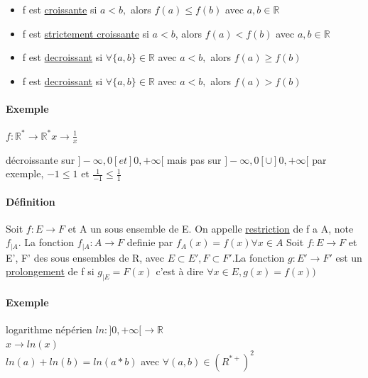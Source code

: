 \begin{itemize}
	\item f est \ul{croissante} si $a < b,$ alors $f(a) \leq f(b)$ avec $a, b \in \mathbb{R}$
	\item f est \ul{strictement croissante} si $a < b$, alors $f(a) < f(b)$ avec $a, b \in \mathbb{R}$
	\item f est \ul{decroissant} si $ \forall \{a, b\} \in \mathbb{R}$ avec $a < b,$ alors $f(a) \geq f(b)$
	\item f est \ul{decroissant} si $ \forall \{a, b\} \in \mathbb{R}$ avec $a < b,$ alors $f(a) > f(b)$
\end{itemize}

\paragraph{Exemple} $f: \mathbb{R}^* \rightarrow \mathbb{R}^*
x \rightarrow \frac{1}{x}$


décroissante sur $]-\infty, 0[ et ]0, +\infty[$ mais pas sur $]-\infty, 0[ \cup ]0, +\infty[$
par exemple, $-1 \leq 1 \text{ et } \frac{1}{-1} \leq \frac{1}{1}$

\paragraph{Définition} Soit $f:E \rightarrow F$ et A un sous ensemble de E.
On appelle \ul{restriction} de f a A, note $f_{|A}$. La fonction $f_{|A} : A \rightarrow F$ definie par $f_{A}(x) = f(x) \forall x \in A$
Soit $f:E \rightarrow F$ et E', F' des sous ensembles de R, avec $E \subset E',F \subset F' . $La fonction $ g : E' \rightarrow F'$ est un \ul{prolongement} de f si $g_{|E} = F(x)$ c'est à dire $\forall x \in E, g(x) = f(x))$

\paragraph{Exemple} logarithme népérien $ln : ]0, +\infty[ \rightarrow \mathbb{R}$
	~\\
	$x \rightarrow ln(x)$
	~\\
	$ln(a) + ln(b) = ln(a*b)$ avec $\forall (a, b) \in (R^{*+})^2$


